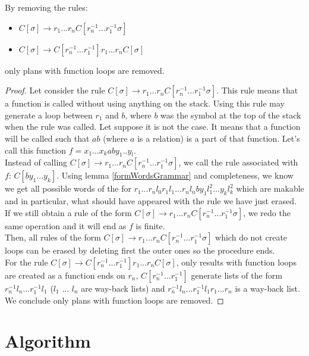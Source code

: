 \documentclass[10pt,a4paper,draft]{article}
\begin{document}
\begin{theorem}
By removing the rules:
\begin{itemize}
 \item $C[\sigma] \rightarrow r_1 ... r_n C[r_{n}^{-1} ... r_1^{-1} \sigma]$
 \item $C[\sigma] \rightarrow C[r_{n}^{-1} ... r_1^{-1}] r_1 ... r_n C[\sigma]$
\end{itemize}
only plans with function loops are removed.
\end{theorem}

\begin{proof}
Let consider the rule $C[\sigma] \rightarrow r_1 ... r_n C[r_{n}^{-1} ... r_1^{-1} \sigma]$. This rule means that a function is called without using anything on the stack. Using this rule may generate a loop between $r_1$ and $b$, where $b$ was the symbol at the top of the stack when the rule was called. Let suppose it is not the case. It means that a function will be called such that  $a b$ (where $a$ is a relation) is a part of that function. Let's call this function $f = x_1 ... x_k a b y_1 .. y_l$.\\
Instead of calling $C[\sigma] \rightarrow r_1 ... r_n C[r_{n}^{-1} ... r_1^{-1} \sigma]$, we call the rule associated with $f$: $C[b y_1 ... y_k]$. Using lemma \ref{formWordsGrammar} and completeness, we know we get all possible words of the for $r_1 ... r_n l_0 r_1 l_1 ... r_n l_n b y_1 l_1^2... y_k l_k^2$ which are makable and in particular, what should have appeared with the rule we have just erased. If we still obtain a rule of the form $C[\sigma] \rightarrow r_1 ... r_n C[r_{n}^{-1} ... r_1^{-1} \sigma]$, we redo the same operation and it will end as $f$ is finite.\\
Then, all rules of the form $C[\sigma] \rightarrow r_1 ... r_n C[r_{n}^{-1} ... r_1^{-1} \sigma]$ which do not create loops can be erased by deleting first the outer ones so the procedure ends.\\
For the rule $C[\sigma] \rightarrow C[r_{n}^{-1} ... r_1^{-1}] r_1 ... r_n C[\sigma]$, only results with function loops are created as a function ends on $r_n$, $C[r_{n}^{-1} ... r_1^{-1}]$ generate lists of the form $r_{n}^{-1} l_n ... r_1^{-1} l_1$ ($l_1$ ... $l_n$ are way-back lists) and $r_{n}^{-1} l_n ... r_1^{-1} l_1 r_1 ... r_n$ is a way-back list.\\
We conclude only plans with function loops are removed.
\end{proof}

\section{Algorithm}
\end{document}
